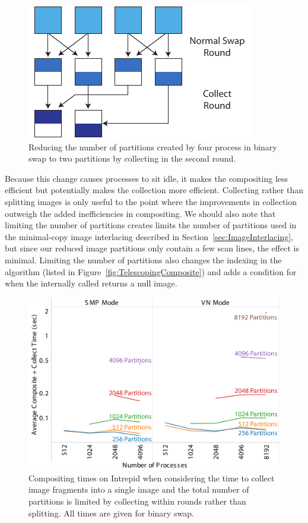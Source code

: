 \documentclass{sig-alternate}
\begin{document}
\begin{figure}[htbp]
  \centering
  \includegraphics[scale=.9]{images/CollectRounds}
  \caption{Reducing the number of partitions created by four process in
    binary swap to two partitions by collecting in the second round.}
  \label{fig:CollectRounds}
\end{figure}

Because this change causes processes to sit idle, it makes the compositing
less efficient but potentially makes the collection more efficient.
Collecting rather than splitting images is only useful to the point where
the improvements in collection outweigh the added inefficiencies in
compositing.  We should also note that limiting the number of partitions
creates limits the number of partitions used in the minimal-copy image
interlacing described in Section~\ref{sec:ImageInterlacing}, but since our
reduced image partitions only contain a few scan lines, the effect is
minimal.  Limiting the number of partitions also changes the indexing in
the  algorithm (listed in
Figure~\ref{fig:TelescopingComposite}) and adds a condition for when the
internally called  returns a null image.

\begin{figure}[htbp]
  \centering
  \includegraphics[width=\linewidth]{images/PartitionCollectIntrepidReduced}
  \caption{Compositing times on Intrepid when considering the time to
    collect image fragments into a single image and the total number of
    partitions is limited by collecting within rounds rather than
    splitting.  All times are given for binary swap.}
  \label{fig:PartitionCollectReduced}
\end{figure}
\end{document}
